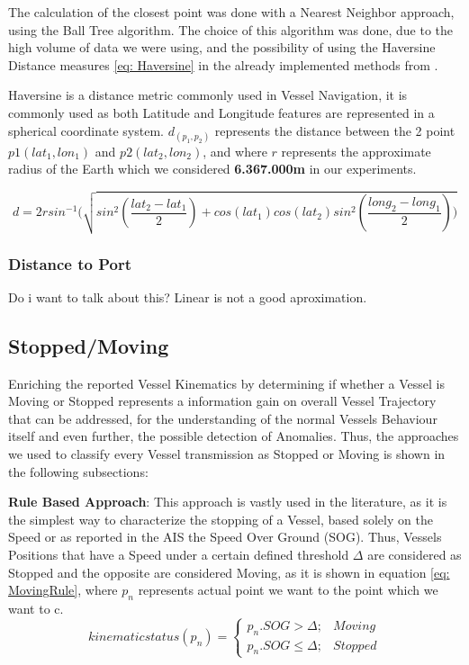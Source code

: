 The calculation of the closest point was done with a Nearest Neighbor approach, using the Ball Tree algorithm. The choice of this algorithm was done, due to the high volume of data we were using, and the possibility of using the Haversine Distance measures \eqref{eq: Haversine} in the already implemented methods from .

Haversine is a distance metric commonly used in Vessel Navigation, it is commonly used as both Latitude and Longitude features are represented in a spherical coordinate system. $d_({p_1}, {p_2})$ represents the distance between the 2 point $p1(lat_1, lon_1)$ and $p2(lat_2, lon_2)$, and where $r$ represents the approximate radius of the Earth which we considered \textbf{6.367.000m} in our experiments.

\begin{equation}
d = 2r sin ^{-1} (\sqrt{sin^2(\frac{lat_{2}-lat_{1}}{2})+cos(lat_{1})cos(lat_{2})sin^2(\frac{long_{2}-long_{1}}{2}))}
\label{eq: Haversine}
\end{equation}

\subsubsection{Distance to Port}
Do i want to talk about this? Linear is not a good aproximation.

\subsection{Stopped/Moving}
Enriching the reported Vessel Kinematics by determining if whether a Vessel is Moving or Stopped represents a information gain on overall Vessel Trajectory that can be addressed, for the understanding of the normal Vessels Behaviour itself and even further, the possible detection of Anomalies.
Thus, the approaches we used to classify every Vessel transmission as Stopped or Moving is shown in the following subsections:

\textbf{Rule Based Approach}:
This approach is vastly used in the literature, as it is the simplest way to characterize the stopping of a Vessel, based solely on the Speed or as reported in the AIS the Speed Over Ground (SOG). Thus, Vessels Positions that have a Speed under a certain defined threshold $\Delta$ are considered as Stopped and the opposite are considered Moving, as it is shown in equation \ref{eq: MovingRule}, where $p_n$ represents actual point we want to the point which we want to c.
\begin{equation}
kinematic status(p_n) = \left\{\begin{matrix}
p_n.SOG > \Delta; & Moving\\ 
p_n.SOG \leq  \Delta; & Stopped
\end{matrix}\right.
\label{eq: MovingRule}
\end{equation}

